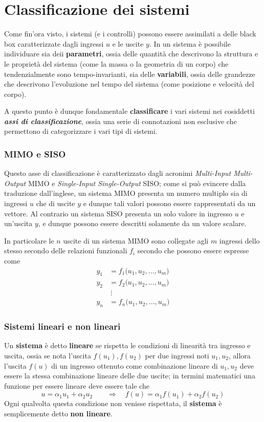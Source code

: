 \section{Classificazione dei sistemi}
	Come fin'ora visto, i sistemi (e i controlli) possono essere assimilati a delle black box caratterizzate dagli ingressi $u$ e le uscite $y$. In un sistema è possibile individuare sia deii \textbf{parametri}, ossia delle quantità che descrivono la struttura e le proprietà del sistema (come la massa o la geometria di un corpo) che tendenzialmente sono tempo-invarianti, sia delle \textbf{variabili}, ossia delle grandezze che descrivono l'evoluzione nel tempo del sistema (come posizione e velocità del corpo).
	
	A questo punto è dunque fondamentale \textbf{classificare} i vari sistemi nei cosiddetti \textit{\textbf{assi di classificazione}}, ossia una serie di connotazioni non esclusive che permettono di categorizzare i vari tipi di sistemi.
	
	\subsubsection{MIMO e SISO}
		Questo asse di classificazione è caratterizzato dagli acronimi \textit{Multi-Input Multi-Output} MIMO e \textit{Single-Input Single-Output} SISO; come si può evincere dalla traduzione dall'inglese, un sistema MIMO presenta un numero multiplo sia di ingressi $u$ che di uscite $y$ e dunque tali valori possono essere rappresentati da un vettore. Al contrario un sistema SISO presenta un solo valore in ingresso $u$ e un'uscita $y$, e dunque possono essere descritti solamente da un valore scalare.
		
		In particolare le $n$ uscite di un sistema MIMO sono collegate agli $m$ ingressi dello stesso secondo delle relazioni funzionali $f_i$ secondo che possono essere espresse come
		\begin{align*}
			y_1 & = f_1\big(u_1, u_2,\dots, u_m\big) \\
			y_2 & = f_2\big(u_1, u_2,\dots, u_m\big) \\
			& \ \vdots \\
			y_n & = f_n\big(u_1, u_2,\dots, u_m\big) 
		\end{align*}
	
	\subsubsection{Sistemi lineari e non lineari}
		Un \textbf{sistema} è detto \textbf{lineare} se rispetta le condizioni di linearità tra ingresso e uscita, ossia se nota l'uscita $f(u_1), f(u_2)$ per due ingressi noti $u_1,u_2$, allora l'uscita $f(u)$ di un ingresso ottenuto come combinazione lineare di $u_1,u_2$ deve essere la stessa combinazione lineare delle due uscite; in termini matematici una funzione per essere lineare deve essere tale che
		\[ u = \alpha_1 u_1 + \alpha_2 u_2 \qquad \Rightarrow \quad f(u) = \alpha_1 f(u_1) + \alpha_2 f(u_2) \]
    	Ogni qualvolta questa condizione non venisse rispettata, il \textbf{sistema} è semplicemente detto \textbf{non lineare}.
    	
    	
    	
    	
    	
    	